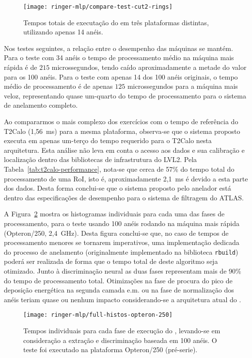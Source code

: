 \begin{figure}
\begin{center}
\texttt{[image: ringer-mlp/compare-test-cut2-rings]}
\end{center}
\caption{Tempos totais de executação do  em três plataformas
distintas, utilizando apenas 14 anéis.}
\label{fig:timings-histo-cut2}
\end{figure}

Nos testes seguintes, a relação entre o desempenho das máquinas se
mantém. Para o teste com 34 anéis o tempo de processamento médio na máquina
mais rápida é de $215$ microssegundos, tendo caído aproximadamente a metade do
valor para os 100 anéis. Para o teste com apenas 14 dos 100 anéis originais, o
tempo médio de processamento é de apenas $125$ microssegundos para a máquina
mais veloz, representando quase um-quarto do tempo de processamento para o
sistema de anelamento completo.

Ao compararmos o mais complexo dos exercícios com o tempo de referência do
T2Calo (1,56~ms) para a mesma plataforma, observa-se que o sistema proposto
executa em apenas um-terço do tempo requerido para o T2Calo nesta
arquitetura. Esta análise não leva em conta o acesso aos dados e sua
calibração e localização dentro das bibliotecas de infrastrutura do LVL2. Pela
Tabela~\ref{tab:t2calo-performance}, nota-se que cerca de 57\% do tempo total
do processamento de uma RoI, isto é, aproximadamente 2,1~ms é devido a esta
parte dos dados. Desta forma conclui-se que o sistema proposto pelo anelador
está dentro das especificações de desempenho para o sistema de filtragem do
ATLAS.

A Figura~\ref{fig:p1-full-histos} mostra os histogramas individuais para cada
uma das fases de processamento, para o teste usando 100 anéis rodando na
máquina mais rápida (Opteron/250, 2,4~GHz). Desta figura conclui-se que, no
caso de tempos de processamento menores se tornarem imperativos, uma
implementação dedicada do processo de anelamento (originalmente implementado
na biblioteca \texttt{rbuild}) poderá ser realizada de forma que o tempo total
de deste algoritmo seja otimizado. Junto à discriminação neural as duas fases
representam mais de 90\% do tempo de processamento total. Otimizações na fase
de procura do pico de deposição energética na segunda camada e.m. ou na fase
de normalização dos anéis teriam quase ou nenhum impacto considerando-se a
arquitetura atual do .

\begin{figure}
\begin{center}
\texttt{[image: ringer-mlp/full-histos-opteron-250]}
\end{center}
\caption{Tempos individuais para cada fase de execução do ,
levando-se em consideração a extração e discriminação baseada em 100 anéis. O
teste foi executado na plataforma Opteron/250 (pré-serie).}
\label{fig:p1-full-histos}
\end{figure}

